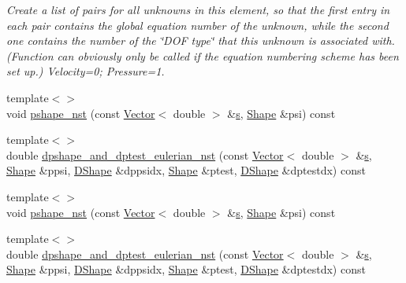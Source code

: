 \begin{DoxyCompactItemize}
\begin{DoxyCompactList}\small\item\em Create a list of pairs for all unknowns in this element, so that the first entry in each pair contains the global equation number of the unknown, while the second one contains the number of the \char`\"{}\+D\+O\+F type\char`\"{} that this unknown is associated with. (Function can obviously only be called if the equation numbering scheme has been set up.) Velocity=0; Pressure=1. \end{DoxyCompactList}\item 
{\footnotesize template$<$$>$ }\\void \hyperlink{classoomph_1_1QCrouzeixRaviartElement_a34e6743118c6e0c14733de53e66c2ea1}{pshape\+\_\+nst} (const \hyperlink{classoomph_1_1Vector}{Vector}$<$ double $>$ \&\hyperlink{cfortran_8h_ab7123126e4885ef647dd9c6e3807a21c}{s}, \hyperlink{classoomph_1_1Shape}{Shape} \&psi) const
\item 
{\footnotesize template$<$$>$ }\\double \hyperlink{classoomph_1_1QCrouzeixRaviartElement_a16287c3b06313a8b44f17e82f1d4020d}{dpshape\+\_\+and\+\_\+dptest\+\_\+eulerian\+\_\+nst} (const \hyperlink{classoomph_1_1Vector}{Vector}$<$ double $>$ \&\hyperlink{cfortran_8h_ab7123126e4885ef647dd9c6e3807a21c}{s}, \hyperlink{classoomph_1_1Shape}{Shape} \&ppsi, \hyperlink{classoomph_1_1DShape}{D\+Shape} \&dppsidx, \hyperlink{classoomph_1_1Shape}{Shape} \&ptest, \hyperlink{classoomph_1_1DShape}{D\+Shape} \&dptestdx) const
\item 
{\footnotesize template$<$$>$ }\\void \hyperlink{classoomph_1_1QCrouzeixRaviartElement_aec2e85c8a3d6fcd64f7f4f8f8028f893}{pshape\+\_\+nst} (const \hyperlink{classoomph_1_1Vector}{Vector}$<$ double $>$ \&\hyperlink{cfortran_8h_ab7123126e4885ef647dd9c6e3807a21c}{s}, \hyperlink{classoomph_1_1Shape}{Shape} \&psi) const
\item 
{\footnotesize template$<$$>$ }\\double \hyperlink{classoomph_1_1QCrouzeixRaviartElement_af007dc64ad3b51f244e4b1bdcb374492}{dpshape\+\_\+and\+\_\+dptest\+\_\+eulerian\+\_\+nst} (const \hyperlink{classoomph_1_1Vector}{Vector}$<$ double $>$ \&\hyperlink{cfortran_8h_ab7123126e4885ef647dd9c6e3807a21c}{s}, \hyperlink{classoomph_1_1Shape}{Shape} \&ppsi, \hyperlink{classoomph_1_1DShape}{D\+Shape} \&dppsidx, \hyperlink{classoomph_1_1Shape}{Shape} \&ptest, \hyperlink{classoomph_1_1DShape}{D\+Shape} \&dptestdx) const
\end{DoxyCompactItemize}
